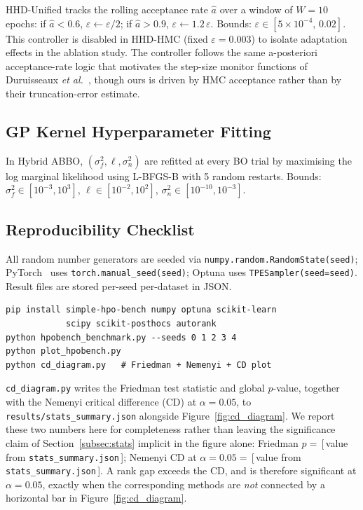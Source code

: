 \documentclass[11pt]{article}
\theoremstyle{definition}
\begin{document}
HHD-Unified tracks the rolling acceptance rate $\hat{a}$ over a window
of $W=10$ epochs: if $\hat{a}<0.6$, $\varepsilon\leftarrow\varepsilon/2$;
if $\hat{a}>0.9$, $\varepsilon\leftarrow1.2\,\varepsilon$. Bounds:
$\varepsilon\in[5\times10^{-4},\,0.02]$. This controller is disabled
in HHD-HMC (fixed $\varepsilon=0.003$) to isolate adaptation effects
in the ablation study. The controller follows the same a-posteriori
acceptance-rate logic that motivates the step-size monitor functions
of Duruisseaux \emph{et al.}~\cite{duruisseaux2021adaptive}, though
ours is driven by HMC acceptance rather than by their truncation-error
estimate.

\subsection{GP Kernel Hyperparameter Fitting}

In Hybrid ABBO, $(\sigma_f^2,\ell,\sigma_n^2)$ are refitted at every BO
trial by maximising the log marginal likelihood using L-BFGS-B with
5 random restarts. Bounds: $\sigma_f^2\in[10^{-3},10^3]$,
$\ell\in[10^{-2},10^2]$, $\sigma_n^2\in[10^{-10},10^{-3}]$.

\subsection{Reproducibility Checklist}
\label{app:experimental_repro}

All random number generators are seeded via
\texttt{numpy.random.RandomState(seed)};
PyTorch~\cite{paszke2019} uses \texttt{torch.manual\_seed(seed)};
Optuna uses \texttt{TPESampler(seed=seed)}.
Result files are stored per-seed per-dataset in JSON.

\begin{verbatim}
pip install simple-hpo-bench numpy optuna scikit-learn
            scipy scikit-posthocs autorank
python hpobench_benchmark.py --seeds 0 1 2 3 4
python plot_hpobench.py
python cd_diagram.py   # Friedman + Nemenyi + CD plot
\end{verbatim}

\texttt{cd\_diagram.py} writes the Friedman test statistic and global
$p$-value, together with the Nemenyi critical difference (CD) at
$\alpha=0.05$, to \texttt{results/stats\_summary.json} alongside
Figure~\ref{fig:cd_diagram}. We report these two numbers here for
completeness rather than leaving the significance claim of
Section~\ref{subsec:stats} implicit in the figure alone: Friedman
$p = $\,[\,value from \texttt{stats\_summary.json}\,]; Nemenyi CD at
$\alpha=0.05 = $\,[\,value from \texttt{stats\_summary.json}\,]. A
rank gap exceeds the CD, and is therefore significant at
$\alpha=0.05$, exactly when the corresponding methods are
\emph{not} connected by a horizontal bar in Figure~\ref{fig:cd_diagram}.
\end{document}

